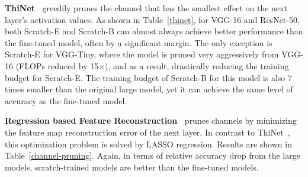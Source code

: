\textbf{ThiNet~\cite{luo2017thinet}} greedily prunes the channel that has the smallest effect on the next layer's activation values.  As shown in Table~\ref{thinet}, for VGG-16 and ResNet-50, both Scratch-E and Scratch-B can almost always achieve better performance than the fine-tuned model, often by a significant margin. The only exception is Scratch-E for VGG-Tiny, where the model is pruned very aggressively from VGG-16 (FLOPs reduced by 15$\times$), and as a result, drastically reducing the training budget for Scratch-E. The training budget of Scratch-B for this model is also 7 times smaller than the original large model, yet it can achieve the same level of accuracy as the fine-tuned model.


\textbf{Regression based Feature Reconstruction~\cite{he2017channel}} prunes channels by minimizing the feature map reconstruction error of the next layer. In contrast to ThiNet~\cite{luo2017thinet}, this optimization problem is solved by LASSO regression. Results are shown in Table~\ref{channel-pruning}. Again, in terms of relative accuracy drop from the large models, scratch-trained models are better than the fine-tuned models.


\renewcommand{\arraystretch}{1.2}
\begin{table}[!htbp]
\small
\centering
{}
\caption{Results for Regression based Feature Reconstruction~\cite{he2017channel}. Pruned models such as ``VGG-16-5$\times$'' are defined in~\cite{he2017channel}. Similar to Table~\ref{thinet}, we compare relative accuracy drop from unpruned large models.}
\label{channel-pruning}
\end{table}

